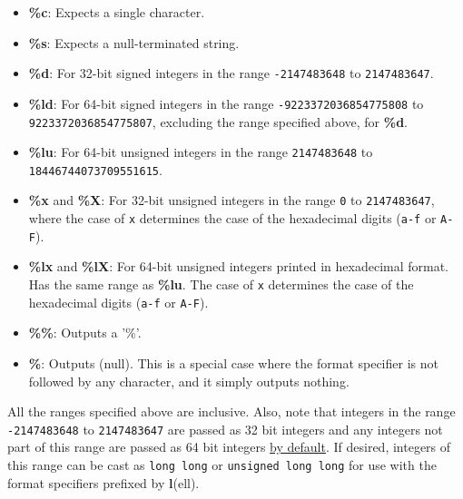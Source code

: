 \begin{itemize}
  \item \textbf{\%c}: Expects a single character.
  \item \textbf{\%s}: Expects a null-terminated string.
  \item \textbf{\%d}: For 32-bit signed integers in the range \texttt{-2147483648} to \texttt{2147483647}.
  \item \textbf{\%ld}: For 64-bit signed integers in the range \texttt{-9223372036854775808} to \texttt{9223372036854775807}, excluding the range specified above, for \textbf{\%d}.
  \item \textbf{\%lu}: For 64-bit unsigned integers in the range \texttt{2147483648} to \texttt{18446744073709551615}.
  \item \textbf{\%x} and \textbf{\%X}: For 32-bit unsigned integers in the range \texttt{0} to \texttt{2147483647}, where the case of \texttt{x} determines the case of the hexadecimal digits (\texttt{a-f} or \texttt{A-F}).
  \item \textbf{\%lx} and \textbf{\%lX}: For 64-bit unsigned integers printed in hexadecimal format. Has the same range as \textbf{\%lu}. The case of \texttt{x} determines the case of the hexadecimal digits (\texttt{a-f} or \texttt{A-F}).
  \item \textbf{\%\%}: Outputs a '\%'.
  \item \textbf{\%}: Outputs (null). This is a special case where the format specifier is not followed by any character, and it simply outputs nothing.
\end{itemize}

\begin{flushleft}
All the ranges specified above are inclusive. Also, note that integers in the 
range \texttt{-2147483648} to \texttt{2147483647} are passed as 32 bit integers 
and any integers not part of this range are passed as 64 bit integers \underline{by default}.
If desired, integers of this range can be cast as \texttt{long long} or \texttt{unsigned long long} 
for use with the format specifiers prefixed by \textbf{l}(ell).
\end{flushleft}

